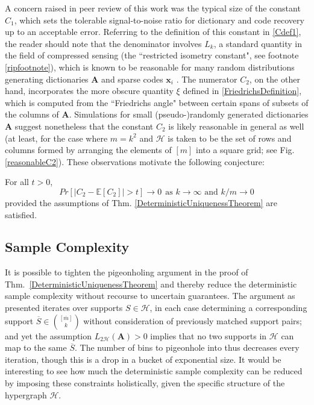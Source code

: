 A concern raised in peer review of this work was the typical size of the constant $C_1$, which sets the tolerable signal-to-noise ratio for dictionary and code recovery up to an acceptable error. Referring to the definition of this constant in \eqref{Cdef1}, the reader should note that the denominator involves $L_k$, a standard quantity in the field of compressed sensing (the ``restricted isometry constant", see footnote \ref{ripfootnote}), which is known to be reasonable for many random distributions generating dictionaries $\mathbf{A}$ and sparse codes $\mathbf{x}_i$ \cite{baraniuk2008simple}. The numerator $C_2$, on the other hand, incorporates the more obscure quantity $\xi$ defined in \eqref{FriedrichsDefinition}, which is computed from the ``Friedrichs angle" between certain spans of subsets of the columns of $\mathbf{A}$. Simulations for small (pseudo-)randomly generated dictionaries $\mathbf{A}$ suggest nonetheless that the constant $C_2$ is likely reasonable in general as well (at least, for the case where $m=k^2$ and $\mathcal{H}$ is taken to be the set of rows and columns formed by arranging the elements of $[m]$ into a square grid; see Fig. \ref{reasonableC2}). These observations motivate the following conjecture:

\begin{conjecture}
For all $t > 0$,
\begin{equation*}
Pr[ \left| C_2- \mathbb{E}[C_2 ] \right| > t] \to 0 \ \ \text{as $k \to \infty$ and $k/m \to 0$} 
\end{equation*}
provided the assumptions of Thm. \ref{DeterministicUniquenessTheorem} are satisfied.
\end{conjecture}

\subsection{Sample Complexity}

It is possible to tighten the pigeonholing argument in the proof of Thm.~\ref{DeterministicUniquenessTheorem} and thereby reduce the deterministic sample complexity without recourse to uncertain guarantees. The argument as presented iterates over supports $S \in \mathcal{H}$, in each case determining a corresponding support $\overline S \in {[\overline m] \choose k}$ without consideration of previously matched support pairs; and yet the assumption $L_{2\mathcal{H}}(\mathbf{A}) > 0$ implies that no two supports in $\mathcal{H}$ can map to the same $\overline S$. The number of bins to pigeonhole into thus decreases every iteration, though this is a drop in a bucket of exponential size. It would be interesting to see how much the deterministic sample complexity can be reduced by imposing these constraints holistically, given the specific structure of the hypergraph $\mathcal{H}$.

